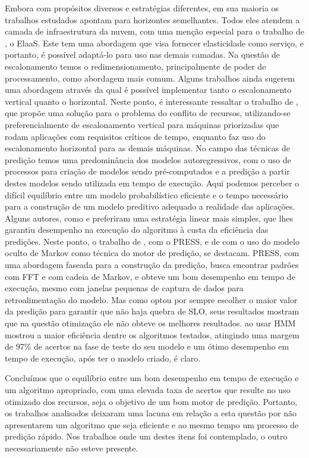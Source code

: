 \documentclass[twoside,english,brazilian]{UNISINOSmonografia}
\begin{document}
Embora com propósitos diversos e estratégias diferentes, em sua maioria os trabalhos estudados apontam para horizontes semelhantes. Todos eles atendem a camada de infraestrutura da nuvem, com uma menção especial para o trabalho de \cite{Kranas2012}, o ElaaS. Este tem uma abordagem que visa fornecer elasticidade como serviço, e portanto, é possível adaptá-lo para uso nas demais camadas. Na questão de escalonamento temos o redimensionamento, principalmente de poder de processamento, como abordagem mais comum. Alguns trabalhos ainda sugerem uma abordagem através da qual é possível implementar tanto o escalonamento vertical quanto o horizontal. Neste ponto, é interessante ressaltar o trabalho de \cite{Yazdanov2012}, que propõe uma solução para o problema do conflito de recursos, utilizando-se preferencialmente de escalonamento vertical para máquinas priorizadas que rodam aplicações com requisitos críticos de tempo, enquanto faz uso do escalonamento horizontal para as demais máquinas. No campo das técnicas de predição temos uma predominância dos modelos autoregressivos, com o uso de processos para criação de modelos sendo pré-computados e a predição a partir destes modelos sendo utilizada em tempo de execução. Aqui podemos perceber o difícil equilíbrio entre um modelo probabilístico eficiente e o tempo necessário para a construção de um modelo preditivo adequado a realidade das aplicações. Alguns autores, como \cite{Yazdanov2012} e \cite{Costache2012} preferiram uma estratégia linear mais simples, que lhes garantiu desempenho na execução do algoritmo à custa da eficiência das predições. Neste ponto, o trabalho de \citep{Wilkes2010}, com o PRESS, e de \cite{Nikravesh2014} com o uso do modelo oculto de Markov como técnica do motor de predição, se destacam. PRESS, com uma abordagem faseada para a construção da predição, busca encontrar padrões com FFT e com cadeia de Markov, e obteve um bom desempenho em tempo de execução, mesmo com janelas pequenas de captura de dados para retroalimentação do modelo. Mas como optou por sempre escolher o maior valor da predição para garantir que não haja quebra de SLO, seus resultados mostram que na questão otimização ele não obteve os melhores resultados. \cite{Nikravesh2014} ao usar HMM mostrou a maior eficiência dentre os algoritmos testados, atingindo uma margem de 97\% de acertos na fase de teste do seu modelo e um ótimo desempenho em tempo de execução, após ter o modelo criado, é claro.

Concluímos que o equilíbrio entre um bom desempenho em tempo de execução e um algoritmo apropriado, com uma elevada taxa de acertos que resulte no uso otimizado dos recursos, seja o objetivo de um bom motor de predição. Portanto, os trabalhos analisados deixaram uma lacuna em relação a esta questão por não apresentarem um algoritmo que seja eficiente e ao mesmo tempo um processo de predição rápido. Nos trabalhos onde um destes itens foi contemplado, o outro necessariamente não esteve presente.
\end{document}
